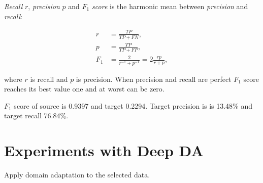 \textit{Recall} \(r\), \textit{precision} \(p\)
and \textit{\(F_1\) score} is the harmonic mean between \textit{precision} and \textit{recall}:

\begin{align}
	r &= \frac{\mathit{TP}}{\mathit{TP} + \mathit{FN}}, \\
	p &= \frac{\mathit{TP}}{\mathit{TP} + \mathit{FP}}, \\
	F_1 &= \frac{2}{r^{-1} + p^{-1}} = 2 \frac{r p}{r + p},
\end{align}

where \(r\) is recall and \(p\) is precision.
When precision and recall are perfect
\(F_1\) score reaches its best value one and at worst can be zero.

\(F_1\) score of source is 0.9397 and target 0.2294.
Target precision is is 13.48\% and target recall 76.84\%.

\begin{table}
	\begin{center}
	\end{center}
\end{table}


\section{Experiments with Deep DA}

Apply domain adaptation to the selected data.

